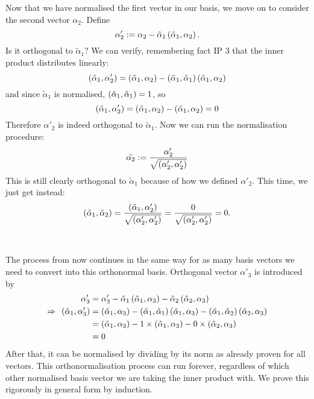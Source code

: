 \\\\
Now that we have normalised the first vector in our basis, we move on to consider the second vector $\alpha_{2}$. Define
$$
\alpha'_{2}:= \alpha_{2}-\tilde{\alpha}_{1} \left(\tilde{\alpha}_{1},\alpha_{2}\right).
$$
Is it orthogonal to $\tilde{\alpha}_{1}$? We can verify, remembering fact IP 3 that the inner product distributes linearly:
$$
\left({\tilde{\alpha}_{1}},\alpha'_{2}\right)=\left(\tilde{\alpha}_{1},\alpha_{2}\right)-\left(\tilde{\alpha}_{1},\tilde{\alpha}_{1}\right) \left(\tilde{\alpha}_{1},\alpha_{2}\right)
$$
and since $\tilde{\alpha}_{1}$ is normalised, $\left(\tilde{\alpha}_{1},\tilde{\alpha}_{1}\right)=1$, so
$$
\left({\tilde{\alpha}_{1}},\alpha'_{2}\right)= \left(\tilde{\alpha}_{1},\alpha_{2}\right)- \left(\tilde{\alpha}_{1},\alpha_{2}\right)= 0
$$
Therefore $\alpha'_{2}$ is indeed orthogonal to $\tilde{\alpha}_{1}$. Now we can run the normalisation procedure:
$$
\tilde{{\alpha_{2}}}:= \frac{\alpha'_{2}}{\sqrt{\left(\alpha'_{2},\alpha'_{2}\right)}}
$$
This is still clearly orthogonal to $\tilde{\alpha}_{1}$ because of how we defined $\alpha'_{2}$. This time, we just get instead:
$$
\left(\tilde{\alpha}_{1},\tilde{\alpha}_{2}\right)=\frac{\left(\tilde{\alpha}_{1},\alpha'_{2}\right)}{\sqrt{\left(\alpha'_{2},\alpha'_{2}\right)}}=\frac{0}{\sqrt{\left(\alpha'_{2},\alpha'_{2}\right)}}=0.
$$
\\\\
The process from now continues in the same way for as many basis vectors we need to convert into this orthonormal basis. Orthogonal vector $\alpha'_{3}$ is introduced by
$$
\begin{aligned}
\alpha'_{3}&=\alpha'_{3}-\tilde{\alpha}_{1}\left(\tilde{\alpha}_{1},\alpha_{3}\right)-\tilde{\alpha}_{2}\left(\tilde{\alpha}_{2},\alpha_{3}\right) \\ 
\Rightarrow\:\: \left(\tilde{\alpha}_{1},\alpha'_{3}\right)&=\left(\tilde{\alpha}_{1},\alpha_{3}\right)-\left(\tilde{\alpha}_{1},\tilde{\alpha}_{1}\right)\left(\tilde{\alpha}_{1},\alpha_{3}\right)-\left(\tilde{\alpha}_{1},\tilde{\alpha}_{2}\right)\left(\tilde{\alpha}_{2},\alpha_{3}\right)\\
&= \left(\tilde{\alpha}_{1},\alpha_{3}\right)-1\times\left(\tilde{\alpha}_{1},\alpha_{3}\right)-0\times\left(\tilde{\alpha}_{2},\alpha_{3}\right)\\
&=0\\
\end{aligned}
$$
After that, it can be normalised by dividing by its norm as already proven for all vectors. This orthonormalisation process can run forever, regardless of which other normalised basis vector we are taking the inner product with.  We prove this rigorously in general form by induction.
